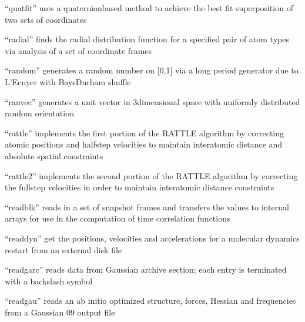 \documentclass[letterpaper,11pt,english]{sphinxmanual}
\begin{document}

“quatfit” uses a quaternion\sphinxhyphen{}based method to achieve the best
fit superposition of two sets of coordinates


“radial” finds the radial distribution function for a specified
pair of atom types via analysis of a set of coordinate frames


“random” generates a random number on {[}0,1{]} via a long
period generator due to L’Ecuyer with Bays\sphinxhyphen{}Durham shuffle


“ranvec” generates a unit vector in 3\sphinxhyphen{}dimensional
space with uniformly distributed random orientation


“rattle” implements the first portion of the RATTLE algorithm
by correcting atomic positions and half\sphinxhyphen{}step velocities to
maintain interatomic distance and absolute spatial constraints


“rattle2” implements the second portion of the RATTLE algorithm
by correcting the full\sphinxhyphen{}step velocities in order to maintain
interatomic distance constraints


“readblk” reads in a set of snapshot frames and transfers
the values to internal arrays for use in the computation
of time correlation functions


“readdyn” get the positions, velocities and accelerations
for a molecular dynamics restart from an external disk file


“readgarc” reads data from Gaussian archive section; each
entry is terminated with a backslash symbol


“readgau” reads an ab initio optimized structure, forces,
Hessian and frequencies from a Gaussian 09 output file

\end{document}

